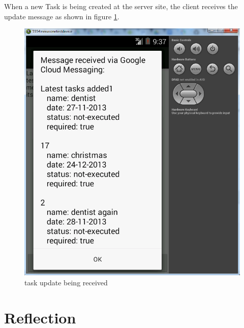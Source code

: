 When a new Task is being created at the server site, the client receives the update message as shown in figure \ref{mobile_task_update_figure}.
\begin{figure}[ht]
	\centering
	\includegraphics[scale=0.7]{images/googlecloud__tasksindevice.png}
	\caption{task update being received}
	\label{mobile_task_update_figure}
\end{figure}


\section{Reflection}

